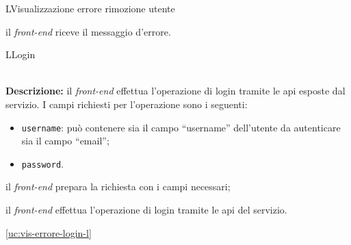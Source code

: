 \begin{usecase}{9}{L}{Visualizzazione errore rimozione utente}



	\begin{ucscenarioprincipale}
		\item il \textit{front-end} riceve il messaggio d'errore.
	\end{ucscenarioprincipale}


	\label{uc:vis-errore-rimozione-utente-l}
\end{usecase}

\begin{usecase}{10}{L}{Login}


	\textbf{\\Descrizione:} il \textit{front-end} effettua l'operazione di login tramite le \acrshort{api} esposte dal servizio.
	I campi richiesti per l'operazione sono i seguenti:
	\begin{itemize}[noitemsep]
		\item \texttt{username}: può contenere sia il campo ``username'' dell'utente da autenticare sia il campo ``email'';
		\item \texttt{password}.
	\end{itemize}

	\begin{ucscenarioprincipale}
		\item il \textit{front-end} prepara la richiesta con i campi necessari;
		\item il \textit{front-end} effettua l'operazione di login tramite le \acrshort{api} del servizio.
	\end{ucscenarioprincipale}


	\begin{ucestensioni}
		\item \ref{uc:vis-errore-login-l}
	\end{ucestensioni}

	\label{uc:login-l}
\end{usecase}


